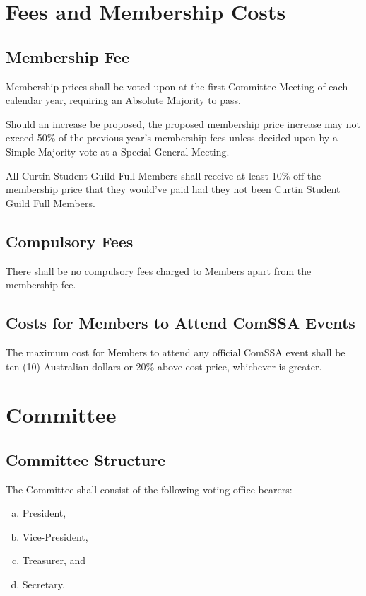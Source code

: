 \documentclass[a4paper,12pt]{article}
\begin{document}
\section{Fees and Membership Costs}

\subsection{Membership Fee}

Membership prices shall be voted upon at the first Committee Meeting of each calendar year, requiring an Absolute Majority to pass.

Should an increase be proposed, the proposed membership price increase may not exceed 50\% of the previous year's membership fees unless decided upon by a Simple Majority vote at a Special General Meeting.

All Curtin Student Guild Full Members shall receive at least 10\% off the membership price that they would've paid had they not been Curtin Student Guild Full Members.

\subsection{Compulsory Fees}

There shall be no compulsory fees charged to Members apart from the membership fee.

\subsection{Costs for Members to Attend ComSSA Events}

The maximum cost for Members to attend any official ComSSA event shall be ten (10) Australian dollars or 20\% above cost price, whichever is greater.

\section{Committee}

\subsection{Committee Structure}

The Committee shall consist of the following voting office bearers:

\begin{enumerate}[a)]
	\item President,
	\item Vice-President,
	\item Treasurer, and
	\item Secretary.
\end{enumerate}
\end{document}
